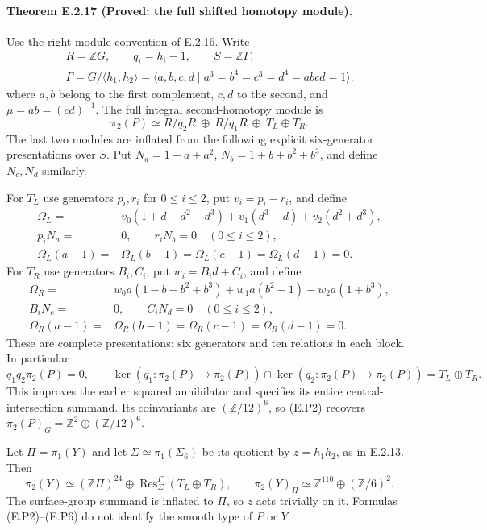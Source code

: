 \paragraph{Theorem E.2.17 (Proved: the full shifted homotopy module).}
Use the right-module convention of E.2.16. Write
\[
 \begin{gathered}
 R=\mathbb ZG,\qquad q_i=h_i-1,\qquad S=\mathbb Z\Gamma,\\
 \Gamma=G/\langle h_1,h_2\rangle
  =\langle a,b,c,d\mid a^3=b^4=c^3=d^4=abcd=1\rangle.
 \end{gathered}
 \tag{E.P1}
\]
where $a,b$ belong to the first complement, $c,d$ to
the second, and $\mu=ab=(cd)^{-1}$. The full integral
second-homotopy module is
\[
 \pi_2(P)\simeq R/q_2R\ \oplus\ R/q_1R
                    \ \oplus\ T_L\oplus T_R.
 \tag{E.P2}
\]
The last two modules are inflated from the following
explicit six-generator presentations over $S$.
Put $N_a=1+a+a^2$, $N_b=1+b+b^2+b^3$, and define
$N_c,N_d$ similarly.

For $T_L$ use generators $p_i,r_i$ for $0\leq i\leq2$,
put $v_i=p_i-r_i$, and define
\[
 \begin{split}
 \Omega_L={}&v_0(1+d-d^2-d^3)
       +v_1(d^3-d)+v_2(d^2+d^3),\\
 p_iN_a={}&0,\qquad r_iN_b=0\quad(0\leq i\leq2),\\
 \Omega_L(a-1)={}&\Omega_L(b-1)
       =\Omega_L(c-1)=\Omega_L(d-1)=0.
 \end{split}
 \tag{E.P3}
\]
For $T_R$ use generators $B_i,C_i$, put $w_i=B_id+C_i$,
and define
\[
 \begin{split}
 \Omega_R={}&w_0a(1-b-b^2+b^3)
              +w_1a(b^2-1)-w_2a(1+b^3),\\
 B_iN_c={}&0,\qquad C_iN_d=0\quad(0\leq i\leq2),\\
 \Omega_R(a-1)={}&\Omega_R(b-1)
       =\Omega_R(c-1)=\Omega_R(d-1)=0.
 \end{split}
 \tag{E.P4}
\]
These are complete presentations: six generators and
ten relations in each block. In particular
\[
 q_1q_2\pi_2(P)=0,\qquad
 \ker(q_1:\pi_2(P)\to\pi_2(P))
  \cap\ker(q_2:\pi_2(P)\to\pi_2(P))=T_L\oplus T_R.
 \tag{E.P5}
\]
This improves the earlier squared annihilator and
specifies its entire central-intersection summand.
Its coinvariants are $(\mathbb Z/12)^6$, so (E.P2)
recovers $\pi_2(P)_G=\mathbb Z^2\oplus(\mathbb Z/12)^6$.

Let $\Pi=\pi_1(Y)$ and let $\Sigma\simeq\pi_1(\Sigma_6)$
be its quotient by $z=h_1h_2$, as in E.2.13. Then
\[
 \pi_2(Y)\simeq(\mathbb Z\Pi)^{24}
          \oplus\operatorname{Res}^{\Gamma}_{\Sigma}(T_L\oplus T_R),
 \qquad
 \pi_2(Y)_\Pi\simeq\mathbb Z^{110}\oplus(\mathbb Z/6)^2.
 \tag{E.P6}
\]
The surface-group summand is inflated to $\Pi$, so
$z$ acts trivially on it. Formulas (E.P2)--(E.P6)
do not identify the smooth type of $P$ or $Y$.

